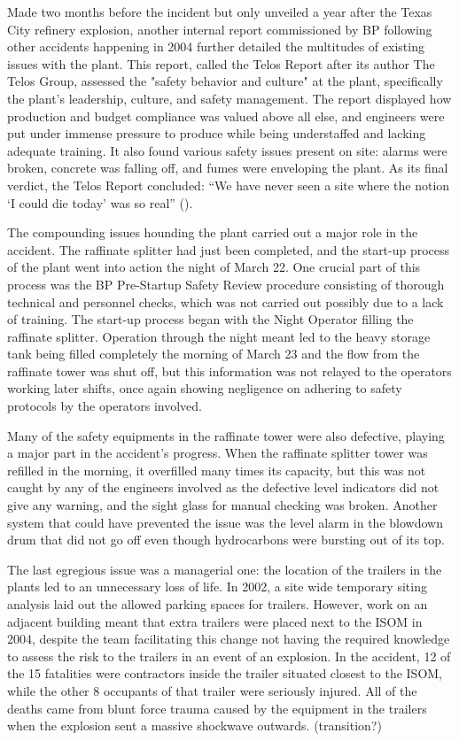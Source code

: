 \documentclass[12pt]{article}
\begin{document}
	Made two months before the incident but only unveiled a year after the Texas City refinery explosion, another internal report commissioned by BP following other accidents happening in 2004 further detailed the multitudes of existing issues with the plant. This report, called the Telos Report after its author The Telos Group, assessed the "safety behavior and culture" at the plant, specifically the plant's leadership, culture, and safety management. The report displayed how production and budget compliance was valued above all else, and engineers were put under immense pressure to produce while being understaffed and lacking adequate training. It also found various safety issues present on site: alarms were broken, concrete was falling off, and fumes were enveloping the plant. As its final verdict, the Telos Report concluded: “We have never seen a site where the notion ‘I could die today’ was so real” (\cite{telosreport}).
	
	 The compounding issues hounding the plant carried out a major role in the accident. The raffinate splitter had just been completed, and the start-up process of the plant went into action the night of March 22. One crucial part of this process was the BP Pre-Startup Safety Review procedure consisting of thorough technical and personnel checks, which was not carried out possibly due to a lack of training. The start-up process began with the Night Operator filling the raffinate splitter. Operation through the night meant led to the heavy storage tank being filled completely the morning of March 23 and the flow from the raffinate tower was shut off, but this information was not relayed to the operators working later shifts, once again showing negligence on adhering to safety protocols by the operators involved. 
	 
	  Many of the safety equipments in the raffinate tower were also defective, playing a major part in the accident's progress. When the raffinate splitter tower was refilled in the morning, it overfilled many times its capacity, but this was not caught by any of the engineers involved as the defective level indicators did not give any warning, and the sight glass for manual checking was broken.  Another system that could have prevented the issue was the level alarm in the blowdown drum that did not go off even though hydrocarbons were bursting out of its top. 
	  
	  The last egregious issue was a managerial one: the location of the trailers in the plants led to an unnecessary loss of life. In 2002, a site wide temporary siting analysis laid out the allowed parking spaces for trailers. However, work on an adjacent building meant that extra trailers were placed next to the ISOM in 2004, despite the team facilitating this change not having the required knowledge to assess the risk to the trailers in an event of an explosion. In the accident, 12 of the 15 fatalities were contractors inside the trailer situated closest to the ISOM, while the other 8 occupants of that trailer were seriously injured. All of the deaths came from blunt force trauma caused by the equipment in the trailers when the explosion sent a massive shockwave outwards. (transition?)
	
\end{document}
